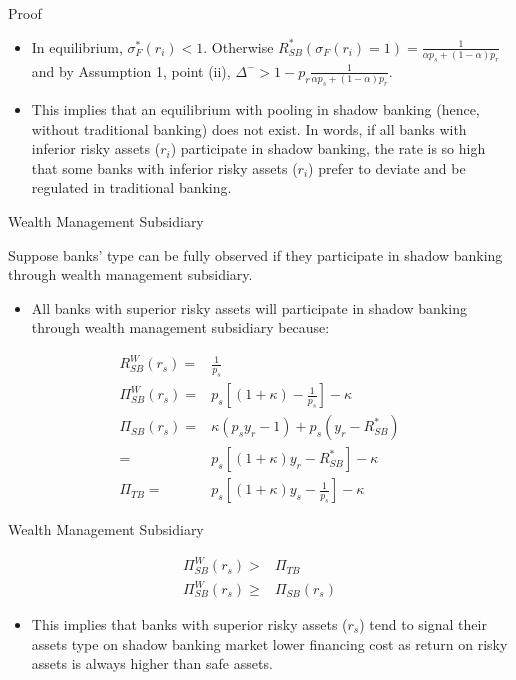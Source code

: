 \documentclass[
  ignorenonframetext,
]{beamer}
\providecommand{\tightlist}{%
  \setlength{\itemsep}{0pt}\setlength{\parskip}{0pt}}
\begin{document}
\begin{frame}{Proof}
\protect\hypertarget{proof-4}{}

\begin{itemize}
\item
  In equilibrium, \(\sigma^*_{F}(r_{i})<1\). Otherwise
  \(R^*_{SB}(\sigma_{F}(r_{i})=1)=\frac{1}{\alpha p_{s}+(1-\alpha)p_{r}}\)
  and by Assumption 1, point (ii),
  \(\Delta^->1-p_{r}\frac{1}{\alpha p_{s}+(1-\alpha)p_{r}}\).
\item
  This implies that an equilibrium with pooling in shadow banking
  (hence, without traditional banking) does not exist. In words, if all
  banks with inferior risky assets (\(r_{i}\)) participate in shadow
  banking, the rate is so high that some banks with inferior risky
  assets (\(r_{i}\)) prefer to deviate and be regulated in traditional
  banking.
\end{itemize}

\end{frame}

\begin{frame}{Wealth Management Subsidiary}
\protect\hypertarget{wealth-management-subsidiary}{}

Suppose banks' type can be fully observed if they participate in shadow
banking through wealth management subsidiary.

\begin{itemize}
\tightlist
\item
  All banks with superior risky assets will participate in shadow
  banking through wealth management subsidiary because:
\end{itemize}

\[
\begin{align*}
R^W_{SB}(r_{s})=&\frac{1}{p_{s}}\\
\Pi^W_{SB}(r_{s})=&p_{s}[(1+\kappa)-\frac{1}{p_{s}}]-\kappa\\
\Pi_{SB}(r_{s})=&\kappa(p_{s}y_{r}-1)+p_{s}(y_{r}-R^*_{SB})\\
=&p_{s}[(1+\kappa)y_{r}-R^*_{SB}]-\kappa\\
\Pi_{TB}=&p_{s}[(1+\kappa)y_{s}-\frac{1}{p_{s}}]-\kappa
\end{align*}
\]

\end{frame}

\begin{frame}{Wealth Management Subsidiary}
\protect\hypertarget{wealth-management-subsidiary-1}{}

\[
\begin{align*}
\Pi^W_{SB}(r_{s})>&\Pi_{TB}\\
\Pi^W_{SB}(r_{s})\geq&\Pi_{SB}(r_{s})
\end{align*}
\]

\begin{itemize}
\tightlist
\item
  This implies that banks with superior risky assets (\(r_{s}\)) tend to
  signal their assets type on shadow banking market lower financing cost
  as return on risky assets is always higher than safe assets.
\end{itemize}

\end{frame}
\end{document}
